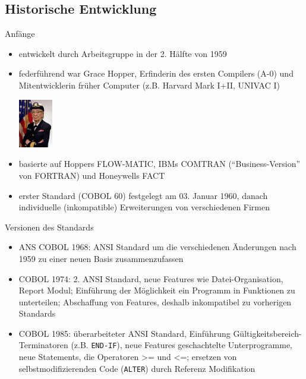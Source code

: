 \documentclass[handout]{beamer}
\begin{document}
\subsection{Historische Entwicklung}
\begin{frame}{Anfänge}
	\begin{itemize}[<+->]
		\item
			entwickelt durch Arbeitsgruppe in der 2. H\"alfte von 1959
		\item%
  \begin{minipage}[t]{0.7\textwidth}
	federführend war Grace Hopper, Erfinderin des ersten Compilers (A-0) und Mitentwicklerin fr\"uher Computer (z.B. Harvard Mark I+II, UNIVAC I)
	\end{minipage}\hspace{2pt}
	\begin{minipage}[t]{0.15\textwidth}
	\vspace{-12pt}%
    \includegraphics[width=1.5cm]{Grace_Hopper_small}
	\end{minipage}
		\item
			basierte auf Hoppers FLOW-MATIC, IBMs COMTRAN (``Business-Version'' von FORTRAN) und Honeywells FACT
		\item
		erster Standard (COBOL 60) festgelegt am 03. Januar 1960, danach individuelle (inkompatible) Erweiterungen von verschiedenen Firmen
	\end{itemize}
\end{frame}

\begin{frame}{Versionen des Standards}
	\begin{itemize}[<+->]
		\item
			ANS COBOL 1968: ANSI Standard um die verschiedenen \"Anderungen nach 1959 zu einer neuen Basis zusammenzufassen
		\item
			COBOL 1974: 2. ANSI Standard, neue Features wie Datei-Organisation, Report Modul; Einführung der Möglichkeit ein Programm in Funktionen zu unterteilen; Abschaffung von Features, deshalb inkompatibel zu vorherigen Standards
		\item
			COBOL 1985: \"uberarbeiteter ANSI Standard, Einf\"uhrung G\"ultigkeitsbereich-Terminatoren (z.B. \texttt{END-IF}), neue Features geschachtelte Unterprogramme, neue Statements, die Operatoren >= und <=; ersetzen von selbstmodifizierenden Code (\texttt{ALTER}) durch Referenz Modifikation
	\end{itemize}
\end{frame}
\end{document}
